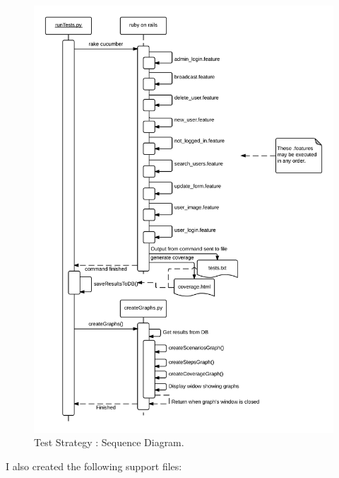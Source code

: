 \documentclass[10pt,a4paper,titlepage]{article}
\begin{document}
\begin{figure}[H]
\begin{center}
\includegraphics[scale=0.25]{include/Sequence_Diagram.png}  
\caption{Test Strategy : Sequence Diagram. }
\label{fig:sequenceDiagram}
\end{center}
\end{figure}
I also created the following support files:
\end{document}
